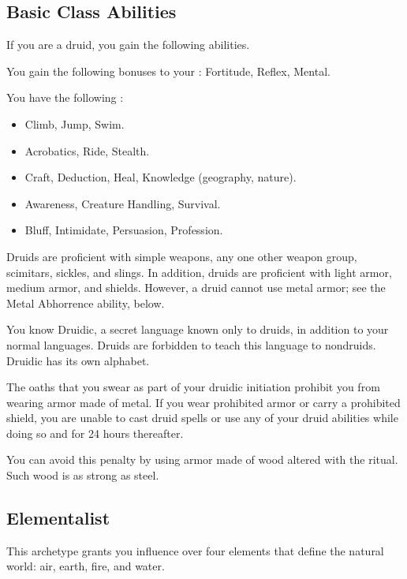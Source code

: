     \subsection{Basic Class Abilities}
        If you are a druid, you gain the following abilities.

        You gain the following bonuses to your :  Fortitude,  Reflex,  Mental.

        You have the following :
        \begin{itemize}
            \item {} Climb, Jump, Swim.
            \item {} Acrobatics, Ride, Stealth.
            \item {} Craft, Deduction, Heal, Knowledge (geography, nature).
            \item {} Awareness, Creature Handling, Survival.
            \item {} Bluff, Intimidate, Persuasion, Profession.
        \end{itemize}

        Druids are proficient with simple weapons, any one other weapon group, scimitars, sickles, and slings.
        In addition, druids are proficient with light armor, medium armor, and shields.
        However, a druid cannot use metal armor; see the Metal Abhorrence ability, below.

        You know Druidic, a secret language known only to druids, in addition to your normal languages.
        Druids are forbidden to teach this language to nondruids.
        Druidic has its own alphabet.

        The oaths that you swear as part of your druidic initiation prohibit you from wearing armor made of metal.
        If you wear prohibited armor or carry a prohibited shield, you are unable to cast druid spells or use any of your  druid abilities while doing so and for 24 hours thereafter.

        You can avoid this penalty by using armor made of wood altered with the  ritual.
        Such wood is as strong as steel.

    \subsection{Elementalist}\label{Elementalist}
        This archetype grants you influence over four elements that define the natural world: air, earth, fire, and water.

